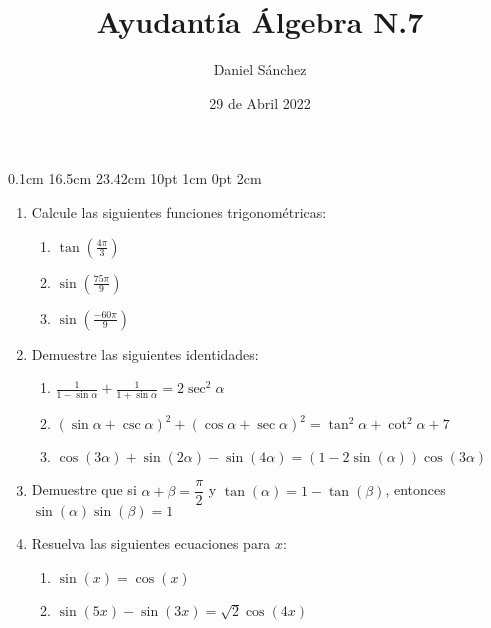 \documentclass[12pt]{article}
\newcommand{\D}{\displaystyle}
\begin{document}
\setmargins{2.5cm}
{0.1cm}
{16.5cm}
{23.42cm}
{10pt}
{1cm}
{0pt}
{2cm}

\title{Ayudant\'ia \'Algebra N.7}
\date{29 de Abril 2022}
\author{Daniel S\'anchez}
\maketitle

\begin{enumerate}
      \item Calcule las siguientes funciones trigonom\'etricas:
            \begin{enumerate}
                  \item $\D \tan \left(\frac{4\pi}{3}\right)$
                  \item $\D \sin \left(\frac{75\pi}{9}\right)$
                  \item $\D \sin \left(\frac{-60\pi}{9}\right)$
            \end{enumerate}
      \item Demuestre las siguientes identidades:
            \begin{enumerate}
                  \item $\D \frac{1}{1-\sin \alpha} + \frac{1}{1+\sin \alpha} = 2\sec ^2 \alpha$
                  \item $(\sin \alpha + \csc \alpha)^2 + (\cos \alpha + \sec \alpha)^2 = \tan ^2 \alpha + \cot ^2 \alpha + 7$
                  \item $\cos (3\alpha) + \sin (2\alpha) - \sin (4\alpha) = (1-2\sin(\alpha))\cos(3\alpha)$
            \end{enumerate}
      \item Demuestre que si $\alpha + \beta = \dfrac{\pi}{2}$ y $\tan (\alpha) = 1-\tan (\beta)$, entonces $\sin(\alpha)\sin(\beta)=1$
      \item Resuelva las siguientes ecuaciones para $x$:
            \begin{enumerate}
                  \item $\sin (x) = \cos (x)$
                  \item $\sin (5x) - \sin (3x) = \sqrt{2}\cos (4x)$
            \end{enumerate}
\end{enumerate}
\end{document}
